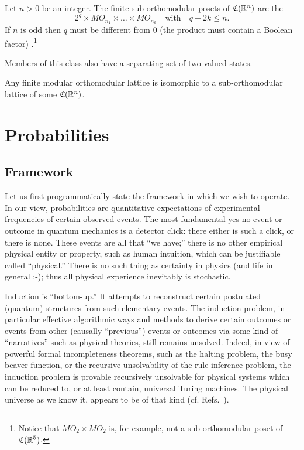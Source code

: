 \documentclass[%
  preprint,
 showpacs,
 showkeys,
 preprintnumbers,
 amsmath,amssymb,
 aps,
 rmp,
  longbibliography,
 ]{revtex4-1}
\begin{document}
Let $n>0$ be an integer.
          The finite sub-orthomodular posets of ${\frak C} ({\Bbb
R}^n)$ are the
        $$2^q \times MO_{n_1} \times\dots \times MO_{n_k}\quad
\textrm{with}\quad
q +2k\leq
        n.$$ If $n$ is odd then $q$ must be different from 0 (the
product must
        contain a Boolean factor) \cite{cheval-priv}.\footnote{
Notice that $MO_2\times MO_2 $ is, for example,  not a sub-orthomodular
poset of
${\frak C} ({\Bbb R}^5)$.}

Members of this class also
have a separating set of two-valued states.

        Any finite modular orthomodular lattice is isomorphic to a
sub-orthomodular lattice of some
${\frak C}
({\Bbb R}^n)$.




\section{Probabilities}


\subsection{Framework}

Let us first programmatically state the framework in which we wish to operate.
In our view, probabilities are quantitative expectations of experimental frequencies
of certain observed events.
The most fundamental yes-no event or outcome in quantum mechanics is a detector click:
there either is such a click, or there is none.
These events are all that ``we have;'' there is no other empirical physical
entity or property, such as human intuition, which can be justifiable called
``physical.''
There is no such thing as certainty in physics (and life in general ;-);
thus all physical experience inevitably is stochastic.

Induction is ``bottom-up.'' It attempts to reconstruct certain postulated (quantum)
structures from such elementary events.
The induction problem, in particular effective algorithmic ways and methods
to derive certain outcomes or events from other (causally ``previous'')
events or outcomes via some kind of ``narratives'' such as physical theories,
still remains unsolved.
Indeed, in view of powerful formal incompleteness theorems, such as the halting problem,
the busy beaver function,
or the recursive unsolvability of the
rule inference problem, the induction problem is provable recursively unsolvable for
physical systems which can be reduced to, or at least contain, universal Turing machines.
The physical universe as we know it, appears to be of that kind
(cf. Refs.~\cite{svozil-93,svozil-unev}).
\end{document}
